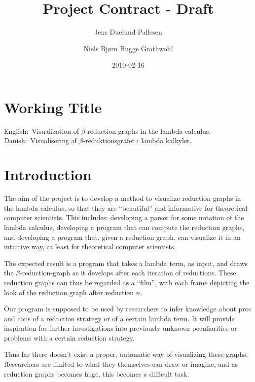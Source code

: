 \documentclass[11pt,oneside,a4paper]{article}
\title{Project Contract - Draft}
\author{Jens Duelund Pallesen \and
Niels Bjørn Bugge Grathwohl}
\date{2010-02-16}
\begin{document}
\maketitle


\section{Working Title}

English$:$ Visualization of $\beta$-reduction-graphs in the lambda calculus.\\
Danish$: $ Visualisering af $\beta$-reduktionsgrafer i lambda kalkyler.

\section{Introduction}

The aim of the project is to develop a method to visualize reduction graphs in
the lambda calculus, so that they are ``beautiful'' and informative for
theoretical computer scientists. This includes: developing a parser for some
notation of the lambda calculus, developing a program that can compute the
reduction graphs, and developing a program that, given a reduction graph, can
visualize it in an intuitive way, at least for theoretical computer
scientists.


The expected result is a program that takes a lambda term, as input, and draws
the $\beta$-reduction-graph as it develops after each iteration of reductions.
These reduction graphs can thus be regarded as a ``film'', with each frame
depicting the look of the reduction graph after reduction $n$.


Our program is supposed to be used by researchers to infer knowledge about
pros and cons of a reduction strategy or of a certain lambda term. It will
provide inspiration for further investigations into previously unknown
peculiarities or problems with a certain reduction strategy.

Thus far there doesn't exist a proper, automatic way of visualizing these
graphs. Researchers are limited to what they themselves can draw or imagine,
and as reduction graphs becomes huge, this becomes a difficult task.

\end{document}
